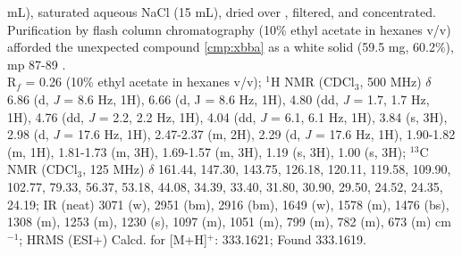 mL), saturated aqueous NaCl (15 mL), dried over , filtered, and concentrated.
Purification by flash column chromatography (10\% ethyl acetate in hexanes v/v) afforded the
unexpected compound \ref{cmp:xbba} as a white solid (59.5 mg, 60.2\%), mp 87-89 \degc. \\
R$_f$ = 0.26 (10\% ethyl acetate in hexanes v/v); $^1$H NMR (CDCl$_3$, 500 MHz) $\delta$ 6.86 (d,
\textit{J} = 8.6 Hz, 1H), 6.66 (d, J = 8.6 Hz, 1H), 4.80 (dd, \textit{J} = 1.7, 1.7 Hz, 1H), 4.76 (dd, \textit{J} = 2.2, 2.2 Hz, 1H), 4.04 (dd, \textit{J} = 6.1, 6.1 Hz, 1H), 3.84 (s, 3H), 2.98 (d, \textit{J} = 17.6 Hz, 1H), 2.47-2.37 (m, 2H), 2.29 (d, \textit{J} = 17.6 Hz, 1H),
1.90-1.82 (m, 1H), 1.81-1.73 (m, 3H), 1.69-1.57 (m, 3H), 1.19 (s, 3H), 1.00 (s, 3H); $^{13}$C NMR
(CDCl$_3$, 125 MHz) $\delta$ 161.44, 147.30, 143.75, 126.18, 120.11, 119.58, 109.90, 102.77, 79.33,
56.37, 53.18, 44.08, 34.39, 33.40, 31.80, 30.90, 29.50, 24.52, 24.35, 24.19; IR (neat) 3071 (w),
2951 (bm), 2916 (bm), 1649 (w), 1578 (m), 1476 (bs), 1308 (m), 1253 (m), 1230 (s), 1097 (m),
1051 (m), 799 (m), 782 (m), 673 (m) cm$^{-1}$; HRMS (ESI+) Calcd. for  [M+H]$^+$:
333.1621; Found 333.1619.

